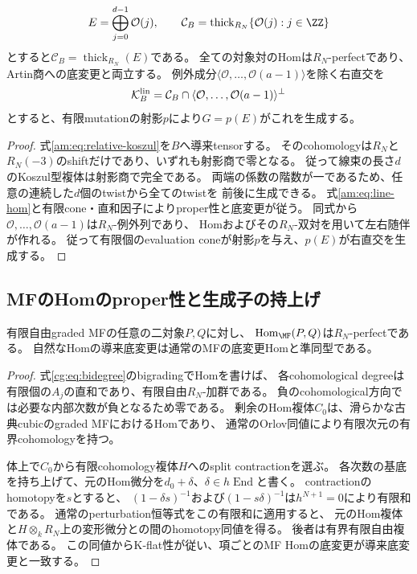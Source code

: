 \begin{lemma}[線束生成部分の有限模型]\label{am:lem:linear-category}
\[
 E=\bigoplus_{j=0}^{d-1}\mathcal O(j),\qquad
 \mathcal C_B=\operatorname{thick}_{R_N}\{\mathcal O(j):j\in\ZZ\}
\]
とすると$\mathcal C_B=\operatorname{thick}_{R_N}(E)$である。
全ての対象対のHomは$R_N$-perfectであり、Artin商への底変更と両立する。
例外成分$\langle\mathcal O,\ldots,\mathcal O(a-1)\rangle$を除く右直交を
\[
 \mathcal K_B^{\rm lin}
 =\mathcal C_B\cap\langle\mathcal O,\ldots,\mathcal O(a-1)\rangle^\perp
\]
とすると、有限mutationの射影$p$により$G=p(E)$がこれを生成する。
\end{lemma}

\begin{proof}
式\eqref{am:eq:relative-koszul}を$B$へ導来tensorする。
そのcohomologyは$R_N$と$R_N(-3)$のshiftだけであり、いずれも射影商で零となる。
従って線束の長さ$d$のKoszul型複体は射影商で完全である。
両端の係数の階数が一であるため、任意の連続した$d$個のtwistから全てのtwistを
前後に生成できる。
式\eqref{am:eq:line-hom}と有限cone・直和因子によりproper性と底変更が従う。
同式から$\mathcal O,\ldots,\mathcal O(a-1)$は$R_N$-例外列であり、
Homおよびその$R_N$-双対を用いて左右随伴が作れる。
従って有限個のevaluation coneが射影$p$を与え、$p(E)$が右直交を生成する。
\end{proof}

\subsection{MFのHomのproper性と生成子の持上げ}

\begin{lemma}\label{am:lem:mf-hom}
有限自由graded MFの任意の二対象$P,Q$に対し、
$\operatorname{Hom}_{\MF}(P,Q)$は$R_N$-perfectである。
自然なHomの導来底変更は通常のMFの底変更Homと準同型である。
\end{lemma}

\begin{proof}
式\eqref{cg:eq:bidegree}のbigradingでHomを書けば、
各cohomological degreeは有限個の$A_j$の直和であり、有限自由$R_N$-加群である。
負のcohomological方向では必要な内部次数が負となるため零である。
剰余のHom複体$C_0$は、滑らかな古典cubicのgraded MFにおけるHomであり、
通常のOrlov同値により有限次元の有界cohomologyを持つ。

体上で$C_0$から有限cohomology複体$H$へのsplit contractionを選ぶ。
各次数の基底を持ち上げて、元のHom微分を$d_0+\delta$、$\delta\in h\operatorname{End}$と書く。
contractionのhomotopyを$s$とすると、
$(1-\delta s)^{-1}$および$(1-s\delta)^{-1}$は$h^{N+1}=0$により有限和である。
通常のperturbation恒等式をこの有限和に適用すると、
元のHom複体と$H\otimes_kR_N$上の変形微分との間のhomotopy同値を得る。
後者は有界有限自由複体である。
この同値からK-flat性が従い、項ごとのMF Homの底変更が導来底変更と一致する。
\end{proof}

